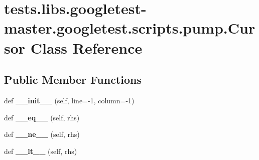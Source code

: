 \hypertarget{classtests_1_1libs_1_1googletest-master_1_1googletest_1_1scripts_1_1pump_1_1Cursor}{}\section{tests.\+libs.\+googletest-\/master.googletest.\+scripts.\+pump.\+Cursor Class Reference}
\label{classtests_1_1libs_1_1googletest-master_1_1googletest_1_1scripts_1_1pump_1_1Cursor}
\subsection*{Public Member Functions}
\begin{DoxyCompactItemize}
\item 
\mbox{\label{classtests_1_1libs_1_1googletest-master_1_1googletest_1_1scripts_1_1pump_1_1Cursor_aa10c4b60d2ab573f4235a4ca57f72b0e}} 
def {\bfseries \+\_\+\+\_\+init\+\_\+\+\_\+} (self, line=-\/1, column=-\/1)
\item 
\mbox{\label{classtests_1_1libs_1_1googletest-master_1_1googletest_1_1scripts_1_1pump_1_1Cursor_a2de4dc585a98dec98c9f1ab270839065}} 
def {\bfseries \+\_\+\+\_\+eq\+\_\+\+\_\+} (self, rhs)
\item 
\mbox{\label{classtests_1_1libs_1_1googletest-master_1_1googletest_1_1scripts_1_1pump_1_1Cursor_ac9e46a54e9aa677381f6d0b6264de7d3}} 
def {\bfseries \+\_\+\+\_\+ne\+\_\+\+\_\+} (self, rhs)
\item 
\mbox{\label{classtests_1_1libs_1_1googletest-master_1_1googletest_1_1scripts_1_1pump_1_1Cursor_a4972a2c9e83aeda4c94a4600a710ac2a}} 
def {\bfseries \+\_\+\+\_\+lt\+\_\+\+\_\+} (self, rhs)
\item 
\mbox{\label{classtests_1_1libs_1_1googletest-master_1_1googletest_1_1scripts_1_1pump_1_1Cursor_ab7517d62795e192ee8abb95385364021}} 

\end{DoxyCompactItemize}
